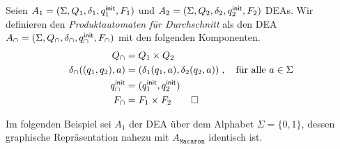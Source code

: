 \begin{Def}\label{def:2.Produktautomat}
Seien $A_1=(\Sigma, Q_1,\delta_1,q^\mathsf{init}_1,F_1)$ und $A_2=(\Sigma, Q_2,\delta_2,q^\mathsf{init}_2,F_2)$ \ac{DEA}s.
Wir definieren den \emph{Produktautomaten für Durchschnitt} als den \ac{DEA} $A_\cap=(\Sigma, Q_\cap,\delta_\cap,q^\mathsf{init}_\cap,F_\cap)$ mit den folgenden Komponenten.
		\begin{align*}
			Q_\cap &= Q_1\times Q_2\\
			\delta_\cap((q_1,q_2),a) &= (\delta_1(q_1,a),\delta_2(q_2,a))\;, \quad \text{für alle } a\in\Sigma\\
			q^\mathsf{init}_\cap &= (q^\mathsf{init}_1,q^\mathsf{init}_2)\\
			F_\cap &= F_1\times F_2\qedhere
		\end{align*}
\end{Def}


Im folgenden Beispiel sei $A_1$ der \ac{DEA} über dem Alphabet $\Sigma=\{0,1\}$, dessen graphische Repräsentation nahezu mit $A_{\mathtt{Macaron}}$ identisch ist.

\begin{center}
\end{center}


